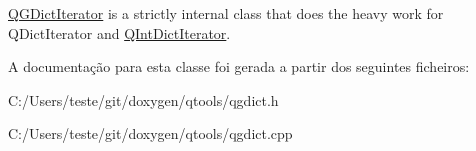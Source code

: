 \hyperlink{class_q_g_dict_iterator}{Q\-G\-Dict\-Iterator} is a strictly internal class that does the heavy work for Q\-Dict\-Iterator and \hyperlink{class_q_int_dict_iterator}{Q\-Int\-Dict\-Iterator}. 

A documentação para esta classe foi gerada a partir dos seguintes ficheiros\-:\begin{DoxyCompactItemize}
\item 
C\-:/\-Users/teste/git/doxygen/qtools/qgdict.\-h\item 
C\-:/\-Users/teste/git/doxygen/qtools/qgdict.\-cpp\end{DoxyCompactItemize}
